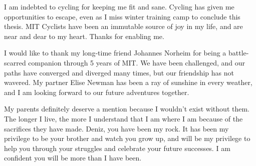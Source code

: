 I am indebted to cycling for keeping me fit and sane. Cycling has given me opportunities to
escape, even as I miss winter training camp to conclude this thesis.
MIT Cyclists have been an immutable source of joy in my life, and are near and dear
to my heart. Thanks for enabling me.

I would like to thank my long-time friend Johannes Norheim
for being a battle-scarred companion through 5 years of MIT. We have been challenged, and
our paths have converged and diverged many times, but our friendship has not wavered.
My partner Elise Newman has been a ray of sunshine in every weather,
and I am looking forward to our future adventures together.

My parents definitely deserve a mention because I wouldn't exist without them.
The longer I live, the more I understand that I am where I am because of the
sacrifices they have made.
Deniz, you have been my rock. It has been my privilege to be your brother and watch
you grow up, and will be my privilege to help you
through your struggles and celebrate your future successes.
I am confident you will be more than I have been.

